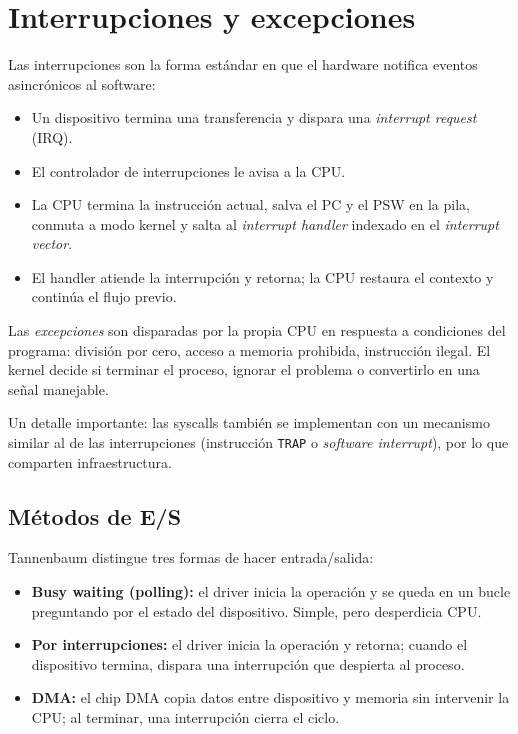 \documentclass[11pt,a4paper]{article}
\begin{document}
\section{Interrupciones y excepciones}

Las interrupciones son la forma estándar en que el hardware notifica
eventos asincrónicos al software:

\begin{itemize}[leftmargin=*]
    \item Un dispositivo termina una transferencia y dispara una
        \emph{interrupt request} (IRQ).
    \item El controlador de interrupciones le avisa a la CPU.
    \item La CPU termina la instrucción actual, salva el PC y el PSW
        en la pila, conmuta a modo kernel y salta al \emph{interrupt
        handler} indexado en el \emph{interrupt vector}.
    \item El handler atiende la interrupción y retorna; la CPU
        restaura el contexto y continúa el flujo previo.
\end{itemize}

Las \emph{excepciones} son disparadas por la propia CPU en respuesta a
condiciones del programa: división por cero, acceso a memoria
prohibida, instrucción ilegal. El kernel decide si terminar el
proceso, ignorar el problema o convertirlo en una señal manejable.

Un detalle importante: las syscalls también se implementan con un
mecanismo similar al de las interrupciones (instrucción \texttt{TRAP}
o \emph{software interrupt}), por lo que comparten infraestructura.

\subsection{Métodos de E/S}

Tannenbaum distingue tres formas de hacer entrada/salida:

\begin{itemize}[leftmargin=*]
    \item \textbf{Busy waiting (polling):} el driver inicia la
        operación y se queda en un bucle preguntando por el estado del
        dispositivo. Simple, pero desperdicia CPU.
    \item \textbf{Por interrupciones:} el driver inicia la operación y
        retorna; cuando el dispositivo termina, dispara una
        interrupción que despierta al proceso.
    \item \textbf{DMA:} el chip DMA copia datos entre dispositivo y
        memoria sin intervenir la CPU; al terminar, una interrupción
        cierra el ciclo.
\end{itemize}
\end{document}
